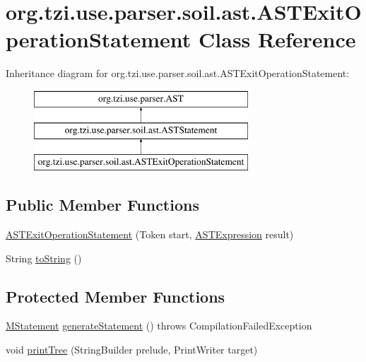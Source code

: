 \hypertarget{classorg_1_1tzi_1_1use_1_1parser_1_1soil_1_1ast_1_1_a_s_t_exit_operation_statement}{\section{org.\-tzi.\-use.\-parser.\-soil.\-ast.\-A\-S\-T\-Exit\-Operation\-Statement Class Reference}
\label{classorg_1_1tzi_1_1use_1_1parser_1_1soil_1_1ast_1_1_a_s_t_exit_operation_statement}
}
Inheritance diagram for org.\-tzi.\-use.\-parser.\-soil.\-ast.\-A\-S\-T\-Exit\-Operation\-Statement\-:\begin{figure}[H]
\begin{center}
\leavevmode
\includegraphics[height=3.000000cm]{classorg_1_1tzi_1_1use_1_1parser_1_1soil_1_1ast_1_1_a_s_t_exit_operation_statement}
\end{center}
\end{figure}
\subsection*{Public Member Functions}
\begin{DoxyCompactItemize}
\item 
\hyperlink{classorg_1_1tzi_1_1use_1_1parser_1_1soil_1_1ast_1_1_a_s_t_exit_operation_statement_a2b40a3150a1be86027d6a117d53fe28b}{A\-S\-T\-Exit\-Operation\-Statement} (Token start, \hyperlink{classorg_1_1tzi_1_1use_1_1parser_1_1ocl_1_1_a_s_t_expression}{A\-S\-T\-Expression} result)
\item 
String \hyperlink{classorg_1_1tzi_1_1use_1_1parser_1_1soil_1_1ast_1_1_a_s_t_exit_operation_statement_aee7d7f0829ead689305ee9eb6041e46e}{to\-String} ()
\end{DoxyCompactItemize}
\subsection*{Protected Member Functions}
\begin{DoxyCompactItemize}
\item 
\hyperlink{classorg_1_1tzi_1_1use_1_1uml_1_1sys_1_1soil_1_1_m_statement}{M\-Statement} \hyperlink{classorg_1_1tzi_1_1use_1_1parser_1_1soil_1_1ast_1_1_a_s_t_exit_operation_statement_ae4076f543d8546dfecfadfe19d81c564}{generate\-Statement} ()  throws Compilation\-Failed\-Exception 
\item 
void \hyperlink{classorg_1_1tzi_1_1use_1_1parser_1_1soil_1_1ast_1_1_a_s_t_exit_operation_statement_a20f71e5df0242af951d1c78a2269676e}{print\-Tree} (String\-Builder prelude, Print\-Writer target)
\end{DoxyCompactItemize}
